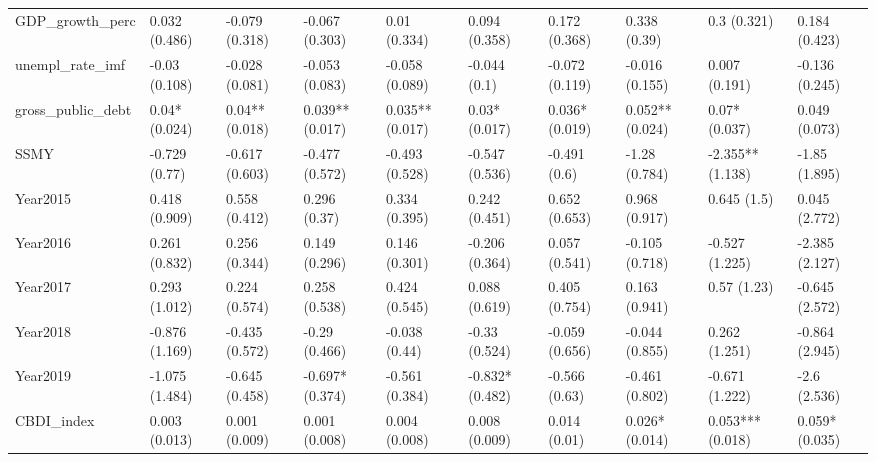 \begin{table}[ht]
\begin{tabular}{llllllllll}
  GDP\_growth\_perc & 0.032 (0.486) & -0.079 (0.318) & -0.067 (0.303) & 0.01 (0.334) & 0.094 (0.358) & 0.172 (0.368) & 0.338 (0.39) & 0.3 (0.321) & 0.184 (0.423) \\ 
  unempl\_rate\_imf & -0.03 (0.108) & -0.028 (0.081) & -0.053 (0.083) & -0.058 (0.089) & -0.044 (0.1) & -0.072 (0.119) & -0.016 (0.155) & 0.007 (0.191) & -0.136 (0.245) \\ 
  gross\_public\_debt & 0.04* (0.024) & 0.04** (0.018) & 0.039** (0.017) & 0.035** (0.017) & 0.03* (0.017) & 0.036* (0.019) & 0.052** (0.024) & 0.07* (0.037) & 0.049 (0.073) \\ 
  SSMY & -0.729 (0.77) & -0.617 (0.603) & -0.477 (0.572) & -0.493 (0.528) & -0.547 (0.536) & -0.491 (0.6) & -1.28 (0.784) & -2.355** (1.138) & -1.85 (1.895) \\ 
  Year2015 & 0.418 (0.909) & 0.558 (0.412) & 0.296 (0.37) & 0.334 (0.395) & 0.242 (0.451) & 0.652 (0.653) & 0.968 (0.917) & 0.645 (1.5) & 0.045 (2.772) \\ 
  Year2016 & 0.261 (0.832) & 0.256 (0.344) & 0.149 (0.296) & 0.146 (0.301) & -0.206 (0.364) & 0.057 (0.541) & -0.105 (0.718) & -0.527 (1.225) & -2.385 (2.127) \\ 
  Year2017 & 0.293 (1.012) & 0.224 (0.574) & 0.258 (0.538) & 0.424 (0.545) & 0.088 (0.619) & 0.405 (0.754) & 0.163 (0.941) & 0.57 (1.23) & -0.645 (2.572) \\ 
  Year2018 & -0.876 (1.169) & -0.435 (0.572) & -0.29 (0.466) & -0.038 (0.44) & -0.33 (0.524) & -0.059 (0.656) & -0.044 (0.855) & 0.262 (1.251) & -0.864 (2.945) \\ 
  Year2019 & -1.075 (1.484) & -0.645 (0.458) & -0.697* (0.374) & -0.561 (0.384) & -0.832* (0.482) & -0.566 (0.63) & -0.461 (0.802) & -0.671 (1.222) & -2.6 (2.536) \\ 
  CBDI\_index & 0.003 (0.013) & 0.001 (0.009) & 0.001 (0.008) & 0.004 (0.008) & 0.008 (0.009) & 0.014 (0.01) & 0.026* (0.014) & 0.053*** (0.018) & 0.059* (0.035) \\ 
   \bottomrule
\end{tabular}
\endgroup
\end{table}
